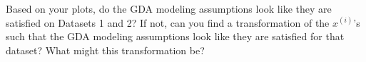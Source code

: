 \item {} Based on your plots, do the GDA modeling assumptions look like they are satisfied on Datasets 1 
and 2? If not, 
can you find a transformation of the $x^{(i)}$'s such
that the GDA modeling assumptions look like they are satisfied for that dataset? What might this transformation be?

